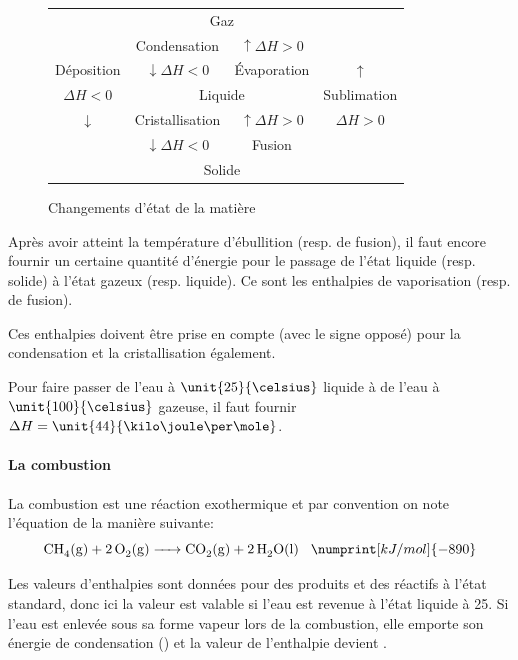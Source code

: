 \documentclass[11pt,a4paper,french]{article}
\begin{document}
\begin{figure}[h!]
	\begin{center}
		\begin{tabular}{|c|cc|c|}
			\cline{1-1} \cline{4-4}
			& \multicolumn{2}{c|}{Gaz} & \\
			\cline{2-3}
			\multicolumn{1}{|c}{} & Condensation & \multicolumn{1}{c}{$\uparrow \Delta H > 0$} & \\
			\multicolumn{1}{|c}{Déposition} & $\downarrow \Delta H < 0$ & \multicolumn{1}{c}{\'Evaporation} & $\uparrow$\\
			\cline{2-3}
			$\Delta H < 0$ & \multicolumn{2}{c|}{Liquide} & Sublimation\\
			\cline{2-3}
			\multicolumn{1}{|c}{$\downarrow$} & Cristallisation & \multicolumn{1}{c}{$\uparrow \Delta H > 0$} & $\Delta H > 0$\\
			\multicolumn{1}{|c}{} & $\downarrow \Delta H < 0$ & \multicolumn{1}{c}{Fusion} & \\
			\cline{2-3}
			& \multicolumn{2}{c|}{Solide} &\\
			\cline{1-1} \cline{4-4}
		\end{tabular}
	\end{center}
	\label{fig:state}
	\caption{Changements d'état de la matière}
\end{figure}

Après avoir atteint la température d'ébullition (resp. de fusion), il faut encore fournir un certaine quantité d'énergie pour le passage de l'état liquide (resp. solide) à l'état gazeux (resp. liquide).
Ce sont les enthalpies de vaporisation (resp. de fusion).

Ces enthalpies doivent être prise en compte (avec le signe opposé) pour la condensation et la cristallisation également.

Pour faire passer de l'eau à $\unit{25}{\celsius}$ liquide à de l'eau à $\unit{100}{\celsius}$ gazeuse, il faut fournir $\Delta H = \unit{44}{\kilo\joule\per\mole}$.

\paragraph{La combustion}
La combustion est une réaction exothermique et par convention on note l'équation de la manière suivante:
$$\ce{CH4(g) + 2O2(g) -> CO2(g) + 2H2O(l)}\hspace{3mm}\numprint[kJ/mol]{-890}$$

Les valeurs d'enthalpies sont données pour des produits et des réactifs à l'état standard, donc ici la valeur   est valable si l'eau est revenue à l'état liquide à 25\celsius.
Si l'eau est enlevée sous sa forme vapeur lors de la combustion, elle emporte son énergie de condensation () et la valeur de l'enthalpie devient .
\end{document}

